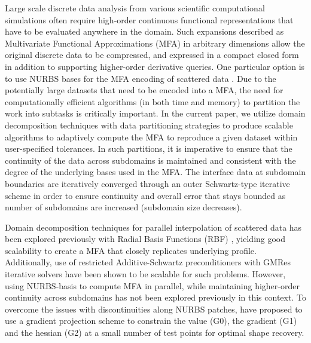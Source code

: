\documentclass[conference]{IEEEtran}
\begin{document}
Large scale discrete data analysis from various scientific computational simulations often require high-order continuous functional representations that have to be evaluated anywhere in the domain. Such expansions described as Multivariate Functional Approximations (MFA) in arbitrary dimensions \cite{nurbs-book} allow the original discrete data to be compressed, and expressed in a compact closed form in addition to supporting higher-order derivative queries. One particular option is to use NURBS bases for the MFA encoding of scattered data \cite{peterka-mfa}. Due to the potentially large datasets that need to be encoded into a MFA, the need for computationally efficient algorithms (in both time and memory) to partition the work into subtasks is critically important. In the current paper, we utilize domain decomposition techniques \cite{smith-ddm} with data partitioning strategies to produce scalable algorithms to adaptively compute the MFA to reproduce a given dataset within user-specified tolerances. In such partitions, it is imperative to ensure that the continuity of the data across subdomains is maintained and consistent with the degree of the underlying bases used in the MFA. The interface data at subdomain boundaries are iteratively converged through an outer Schwartz-type iterative scheme in order to ensure continuity and overall error that stays bounded as number of subdomains are increased (subdomain size decreases).



Domain decomposition techniques for parallel interpolation of scattered data has been explored previously with Radial Basis Functions (RBF) \cite{mai-approx-rbf}, yielding good scalability to create a MFA that closely replicates underlying profile. Additionally, use of restricted Additive-Schwartz preconditioners with GMRes iterative solvers have been shown to be scalable \cite{yokota-rasm-rbf} for such problems. However, using NURBS-basis to compute MFA in parallel, while maintaining higher-order continuity across subdomains has not been explored previously in this context. To overcome the issues with discontinuities along NURBS patches, \cite{zhang-nurbs-continuity} have proposed to use a gradient projection scheme to constrain the value (G0), the gradient (G1) and the hessian (G2) at a small number of test points for optimal shape recovery. 
\end{document}
